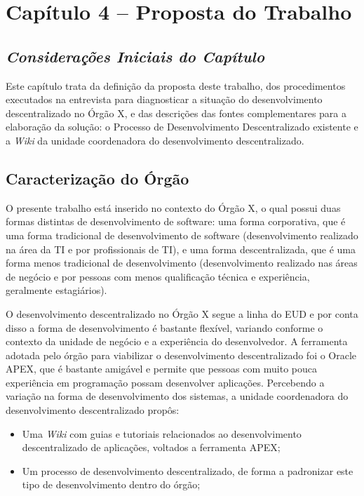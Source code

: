 \chapter[Capítulo 4 – Proposta do Trabalho]{Capítulo 4 – Proposta do Trabalho}

\section{\textit{Considerações Iniciais do Capítulo}}

Este capítulo trata da definição da proposta deste trabalho, dos procedimentos executados na entrevista para diagnosticar a situação do desenvolvimento descentralizado no Órgão X, e das descrições das fontes complementares para a elaboração da solução: o Processo de Desenvolvimento Descentralizado existente e a \textit{Wiki} da unidade coordenadora do desenvolvimento descentralizado.

\section{Caracterização do Órgão}

O presente trabalho está inserido no contexto do Órgão X, o qual possui duas formas distintas de desenvolvimento de software: uma forma corporativa, que é uma forma tradicional de desenvolvimento de software (desenvolvimento realizado na área da TI e por profissionais de TI), e uma forma descentralizada, que é uma forma menos tradicional de desenvolvimento (desenvolvimento realizado nas áreas de negócio e por pessoas com menos qualificação técnica e experiência, geralmente estagiários).

O desenvolvimento descentralizado no Órgão X segue a linha do EUD e por conta disso a forma de desenvolvimento é bastante flexível, variando conforme o contexto da unidade de negócio e a experiência do desenvolvedor. A ferramenta adotada pelo órgão para viabilizar o desenvolvimento descentralizado foi o Oracle APEX, que é bastante amigável e permite que pessoas com muito pouca experiência em programação possam desenvolver aplicações. Percebendo a variação na forma de desenvolvimento dos sistemas, a unidade coordenadora do desenvolvimento descentralizado propôs:

\begin{itemize}
\item Uma \textit{Wiki} com guias e tutoriais relacionados ao desenvolvimento descentralizado de aplicações, voltados a ferramenta APEX;
\item Um processo de desenvolvimento descentralizado, de forma a padronizar este tipo de desenvolvimento dentro do órgão;
\end{itemize}

